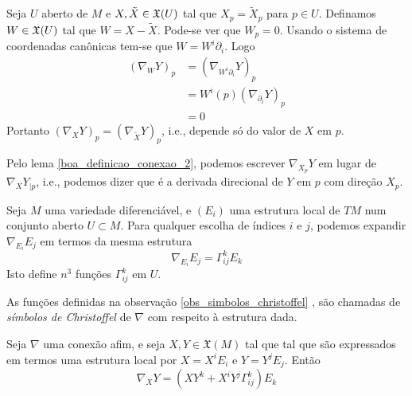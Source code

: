 \begin{demonstracao}
	Seja $U$ aberto de $M$ e $X, \tilde{X} \in \mathfrak{X}(U)$ tal que $X_p = \tilde{X}_p$ para $p \in U$. Definamos $W \in \mathfrak{X}(U)$ tal que $W = X - \tilde{X}$. Pode-se ver que $W_p = 0$. Usando o sistema de coordenadas canônicas tem-se que $W = W^i \partial_i$. Logo
	\begin{align*}
		(\nabla_W Y)_p &= (\nabla_{W^i \partial_i} Y)_p\\
		&=   W^i(p) (\nabla_{\partial_i} Y)_p\\
		&= 0
	\end{align*}
	Portanto $(\nabla_X Y)_p = (\nabla_{\tilde{X}} Y)_p$, i.e., depende só do valor de $X$ em $p$.
\end{demonstracao}

\begin{observacao}
	Pelo lema \ref{boa_definicao_conexao_2}, podemos escrever $\nabla_{X_p} Y$ em lugar de $\nabla_X Y_{|p}$, i.e., podemos dizer que é a derivada direcional de $Y$ em $p$ com direção $X_p$.
\end{observacao}

\begin{observacao}\label{obs_simbolos_christoffel}
	Seja $M$ uma variedade diferenciável, e $(E_i)$ uma estrutura local de $TM$ num conjunto aberto $U \subset M$. Para qualquer escolha de índices $i$ e $j$, podemos expandir $\nabla_{E_i} E_j$ em termos da mesma estrutura
	\begin{equation*}
		\nabla_{E_i} E_j = \Gamma^k_{ij} E_k
	\end{equation*}
	Isto define $n^3$ funções $\Gamma^k_{ij}$ em $U$.
\end{observacao}

\begin{definicao} 
	As funções definidas na observação \ref{obs_simbolos_christoffel} , são chamadas de \emph{símbolos de Christoffel} de $\nabla$ com respeito à estrutura dada.
\end{definicao}

\begin{lema}
	Seja $\nabla$ uma conexão afim, e seja $X,Y \in \mathfrak{X}(M)$ tal que tal que são expressados em termos uma estrutura local por $X = X^i E_i$ e $Y = Y^j E_j$. Então
	\begin{equation*}
		\nabla_X Y = \left( X Y^k + X^i Y^j \Gamma^k_{ij} \right) E_k
	\end{equation*}
\end{lema}

